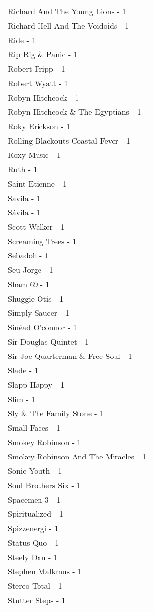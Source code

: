 \documentclass[
]{article}
\begin{document}
\begin{longtable}{l}
Richard And The Young Lions - 1 \\ 
Richard Hell And The Voidoids - 1 \\ 
Ride - 1 \\ 
Rip Rig \& Panic - 1 \\ 
Robert Fripp - 1 \\ 
Robert Wyatt - 1 \\ 
Robyn Hitchcock - 1 \\ 
Robyn Hitchcock \& The Egyptians - 1 \\ 
Roky Erickson - 1 \\ 
Rolling Blackouts Coastal Fever - 1 \\ 
Roxy Music - 1 \\ 
Ruth - 1 \\ 
Saint Etienne - 1 \\ 
Savila - 1 \\ 
Sávila - 1 \\ 
Scott Walker - 1 \\ 
Screaming Trees - 1 \\ 
Sebadoh - 1 \\ 
Seu Jorge - 1 \\ 
Sham 69 - 1 \\ 
Shuggie Otis - 1 \\ 
Simply Saucer - 1 \\ 
Sinéad O'connor - 1 \\ 
Sir Douglas Quintet - 1 \\ 
Sir Joe Quarterman \& Free Soul - 1 \\ 
Slade - 1 \\ 
Slapp Happy - 1 \\ 
Slim - 1 \\ 
Sly \& The Family Stone - 1 \\ 
Small Faces - 1 \\ 
Smokey Robinson - 1 \\ 
Smokey Robinson And The Miracles - 1 \\ 
Sonic Youth - 1 \\ 
Soul Brothers Six - 1 \\ 
Spacemen 3 - 1 \\ 
Spiritualized - 1 \\ 
Spizzenergi - 1 \\ 
Status Quo - 1 \\ 
Steely Dan - 1 \\ 
Stephen Malkmus - 1 \\ 
Stereo Total - 1 \\ 
Stutter Steps - 1 \\ 

\end{longtable}
\end{document}
